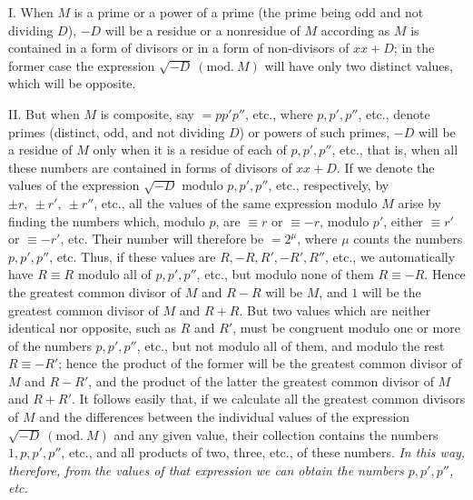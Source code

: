I. When \(M\) is a prime or a power of a prime (the prime being odd and not dividing \(D\)), \(-D\) will be a residue or a nonresidue of \(M\) according as \(M\) is contained in a form of divisors or in a form of non-divisors of \(xx+D\); in the former case the expression \(\surd{-D}\ (\mathrm{mod.}\ M)\) will have only two distinct values, which will be opposite.

II. But when \(M\) is composite, say \(=pp'p''\), etc., where \(p,\allowbreak p',\allowbreak p''\), etc., denote primes (distinct, odd, and not dividing \(D\)) or powers of such primes, \(-D\) will be a residue of \(M\) only when it is a residue of each of \(p,\allowbreak p',\allowbreak p''\), etc., that is, when all these numbers are contained in forms of divisors of \(xx+D\). If we denote the values of the expression \(\surd{-D}\) modulo \(p,\allowbreak p',\allowbreak p''\), etc., respectively, by \(\pm r,\allowbreak \ \pm r',\allowbreak \ \pm r''\), etc., all the values of the same expression modulo \(M\) arise by finding the numbers which, modulo \(p\), are \(\equiv r\) or \(\equiv-r\), modulo \(p'\), either \(\equiv r'\) or \(\equiv-r'\), etc. Their number will therefore be \(=2^\mu\), where \(\mu\) counts the numbers \(p,\allowbreak p',\allowbreak p''\), etc. Thus, if these values are \(R,\allowbreak -R,\allowbreak R',\allowbreak -R',\allowbreak R''\), etc., we automatically have \(R\equiv R\) modulo all of \(p,\allowbreak p',\allowbreak p''\), etc., but modulo none of them \(R\equiv-R\). Hence the greatest common
divisor of \(M\) and \(R-R\) will be \(M\), and \(1\) will be the greatest common divisor of \(M\) and \(R+R\). But two values which are neither identical nor opposite, such as \(R\) and \(R'\), must be congruent modulo one or more of the numbers \(p,\allowbreak p',\allowbreak p''\), etc., but not modulo all of them, and modulo the rest \(R\equiv-R'\); hence the product of the former will be the greatest common divisor of \(M\) and \(R-R'\), and the product of the latter the greatest common divisor of \(M\) and \(R+R'\). It follows easily that, if we calculate all the greatest common divisors of \(M\) and the differences between the individual values of the expression \(\surd{-D}\ (\mathrm{mod.}\ M)\) and any given value, their collection contains the numbers \(1,\allowbreak p,\allowbreak p',\allowbreak p''\), etc., and all products of two, three, etc., of these numbers. \textit{In this way, therefore, from} \textit{the values of that expression we can obtain the numbers \(p,\allowbreak p',\allowbreak p''\), etc.}

